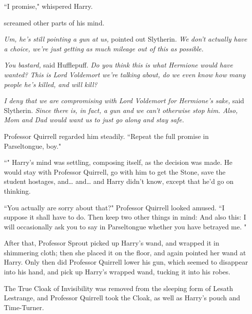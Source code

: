 ``I promise," whispered Harry.

\emph{} screamed other parts of his mind.

\emph{Um, he's still pointing a gun at us,} pointed out Slytherin. \emph{We don't actually have a choice, we're just getting as much mileage out of this as possible.}

\emph{You bastard,} said Hufflepuff. \emph{Do you think this is what Hermione would have wanted? This is Lord Voldemort we're talking about, do we even know how many people he's killed, and will kill?}

\emph{I deny that we are compromising with Lord Voldemort for Hermione's sake,} said Slytherin. \emph{Since there is, in fact, a gun and we can't otherwise stop him. Also, Mom and Dad would want us to just go along and stay safe.}

Professor Quirrell regarded him steadily. ``Repeat the full promise in Parseltongue, boy."

``" Harry's mind was settling, composing itself, as the decision was made. He would stay with Professor Quirrell, go with him to get the Stone, save the student hostages, and{\ldots} and{\ldots} and Harry didn't know, except that he'd go on thinking.

``You actually are sorry about that?" Professor Quirrell looked amused. ``I suppose it shall have to do. Then keep two other things in mind:  And also this: I will occasionally ask you to say in Parseltongue whether you have betrayed me. "

\later

After that, Professor Sprout picked up Harry's wand, and wrapped it in shimmering cloth; then she placed it on the floor, and again pointed her wand at Harry. Only then did Professor Quirrell lower his gun, which seemed to disappear into his hand, and pick up Harry's wrapped wand, tucking it into his robes.

The True Cloak of Invisibility was removed from the sleeping form of Lesath Lestrange, and Professor Quirrell took the Cloak, as well as Harry's pouch and Time-Turner.

